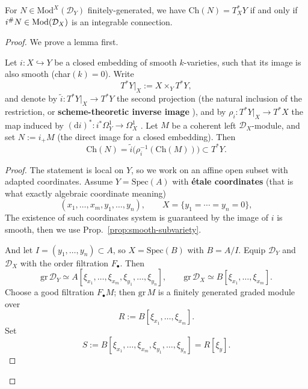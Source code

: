 \begin{corollary}\label{cor:kashiwara_equiv_conormal}
    For $N \in \text{Mod}^{X}(\mathcal{D}_{Y})$ finitely-generated, we have $\text{Ch}(N) = T_{X}^{*}Y$ if and only if $i^{\#}N \in \text{Mod}(\mathcal{D}_X)$ is an integrable connection.
\end{corollary}
\begin{proof}
    We prove a lemma first.

    \begin{lemma}\label{prop:charvar-closed-emb}
        Let $i:X\hookrightarrow Y$ be a closed embedding of smooth $k$-varieties, such that its image is also smooth (char$(k)=0$).
        Write
        \[
            T^*Y|_X:=X\times_Y T^*Y,
        \]
        and denote by $\widetilde i:T^*Y|_X\to T^*Y$ the second projection (the natural inclusion of the
        restriction, or \textbf{scheme-theoretic inverse image}
        \cite[\href{https://stacks.math.columbia.edu/tag/01JV}{Tag 01JV}, \href{https://stacks.math.columbia.edu/tag/01HO}{Tag 01HO}]{stacks-project}),
        and by $\rho_i:T^*Y|_X\to T^*X$ the map induced by $(\mathrm{d}i)^*:i^*\Omega_Y^1\to \Omega_X^1$
        \cite[\href{https://stacks.math.columbia.edu/tag/01LQ}{Tag 01LQ}, \href{https://stacks.math.columbia.edu/tag/01M1}{Tag 01M1}]{stacks-project}.
        Let $M$ be a coherent left $\mathcal{D}_X$-module, and set $N:=i_+M$ (the direct image for a closed embedding).
        Then
        \[
            \mathrm{Ch}(N)=\widetilde i\bigl(\rho_i^{-1}(\mathrm{Ch}(M))\bigr)\subset T^*Y.
        \]
    \end{lemma}

    \begin{proof}
        The statement is local on $Y$, so we work on an affine open subset with adapted coordinates.
        Assume $Y=\mathrm{Spec}(A)$ with \textbf{étale coordinates} (that is what exactly algebraic coordinate meaning)
        \[
            (x_1,\dots,x_m,y_1,\dots,y_n),\qquad X=\{y_1=\cdots=y_n=0\},
        \]
        The existence of such coordinates system is guaranteed by the image of $i$ is smooth, then we use Prop.~\ref{prop:smooth-subvariety}.

        And let $I=(y_1,\dots,y_n)\subset A$, so $X=\mathrm{Spec}(B)$ with $B=A/I$.
        Equip $\mathcal{D}_Y$ and $\mathcal{D}_X$ with the order filtration $F_\bullet$. Then
        \[
            \mathrm{gr}\,\mathcal{D}_Y \simeq A[\xi_{x_1},\dots,\xi_{x_m},\xi_{y_1},\dots,\xi_{y_n}],
            \qquad
            \mathrm{gr}\,\mathcal{D}_X \simeq B[\xi_{x_1},\dots,\xi_{x_m}].
        \]
        Choose a good filtration $F_\bullet M$; then $\mathrm{gr}\,M$ is a finitely generated graded module over
        \[
            R:=B[\xi_{x_1},\dots,\xi_{x_m}].
        \]
        Set
        \[
            S:=B[\xi_{x_1},\dots,\xi_{x_m},\xi_{y_1},\dots,\xi_{y_n}]=R[\xi_y].
        \]


\end{proof}
\end{proof}
